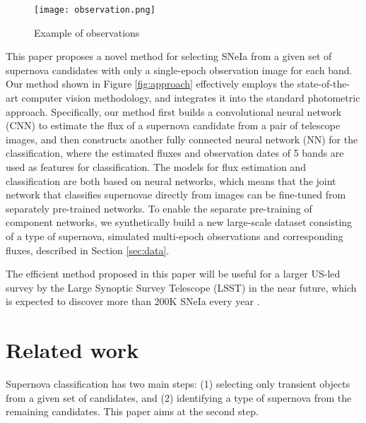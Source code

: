\documentclass[conference,compsoc]{IEEEtran}
\begin{document}
\begin{figure}[t]
  \begin{center}
    \texttt{[image: observation.png]}
    \end{center}
  \caption{Example of observations}
  \label{fig:observation}
\end{figure}

  This paper proposes a novel method for selecting SNeIa from a given set of supernova candidates with only a single-epoch observation image for each band.
  Our method shown in Figure \ref{fig:approach} effectively employs the state-of-the-art computer vision methodology, and integrates it into the standard photometric approach.
  Specifically, our method first builds a convolutional neural network (CNN) to estimate the flux of a supernova candidate from a pair of telescope images, and then constructs another fully connected neural network (NN) for the classification, where the estimated fluxes and observation dates of 5 bands are used as features for classification.
  The models for flux estimation and classification are both based on neural networks, which means that the joint network that classifies supernovae directly from images can be fine-tuned from separately pre-trained networks.
  To enable the separate pre-training of component networks, we synthetically build a new large-scale dataset consisting of a type of supernova, simulated multi-epoch observations and corresponding fluxes, described in Section \ref{sec:data}.

  The efficient method proposed in this paper will be useful for a larger US-led survey by the Large Synoptic Survey Telescope (LSST) in the near future, which is expected to discover more than 200K SNeIa every year \cite{LSSTScienceCollaboration2009}.





\section{Related work}
\label{sec:related}

  Supernova classification has two main steps:
  (1) selecting only transient objects from a given set of candidates, and
  (2) identifying a type of supernova from the remaining candidates.
  This paper aims at the second step. %
\end{document}
